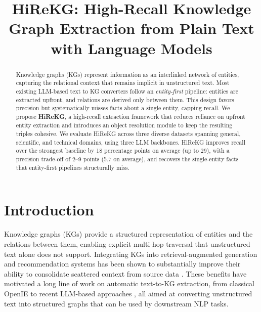 \documentclass[11pt]{article}
\title{HiReKG: High-Recall Knowledge Graph Extraction from Plain Text with Language Models}
\begin{document}
\maketitle 
\begin{abstract}
    Knowledge graphs (KGs) represent information as an interlinked network of entities, capturing the relational context that remains implicit in unstructured text. Most existing LLM-based text to KG converters follow an \emph{entity-first} pipeline: entities are extracted upfront, and relations are derived only between them. This design favors precision but systematically misses facts about a single entity, capping recall. We propose \textbf{HiReKG}, a high-recall extraction framework that reduces reliance on upfront entity extraction and introduces an object resolution module to keep the resulting triples cohesive. We evaluate HiReKG across three diverse datasets spanning general, scientific, and technical domains, using three LLM backbones. HiReKG improves recall over the strongest baseline by 18 percentage points on average (up to 29), with a precision trade-off of 2--9 points (5.7 on average), and recovers the single-entity facts that entity-first pipelines structurally miss.
\end{abstract}

\section{Introduction}
\label{sec:introduction}

Knowledge graphs (KGs) provide a structured representation of entities and the relations between them, enabling explicit multi-hop traversal that unstructured text alone does not support. Integrating KGs into retrieval-augmented generation and recommendation systems has been shown to substantially improve their ability to consolidate scattered context from source data \citep{llm-kg-emnlp-survey, recommendation_kg, text_summarization_kg}. These benefits have motivated a long line of work on automatic text-to-KG extraction, from classical OpenIE \citep{openie} to recent LLM-based approaches \citep{kg-llm-survey-arxiv}, all aimed at converting unstructured text into structured graphs that can be used by downstream NLP tasks.

\end{document}
